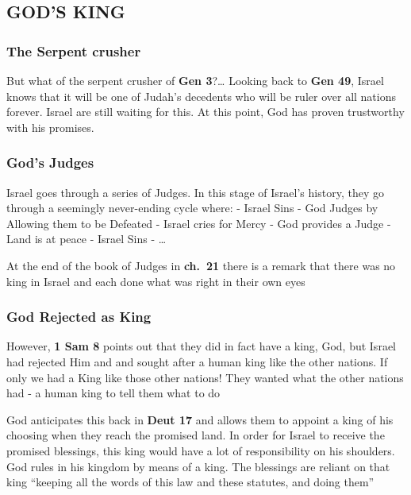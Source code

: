 \documentclass[]{article}
\begin{document}
\hypertarget{gods-king}{%
\subsection{GOD'S KING}\label{gods-king}}

\hypertarget{the-serpent-crusher}{%
\subsubsection{The Serpent crusher}\label{the-serpent-crusher}}

But what of the serpent crusher of \textbf{Gen 3}?\ldots{} Looking back
to \textbf{Gen 49}, Israel knows that it will be one of Judah's
decedents who will be ruler over all nations forever. Israel are still
waiting for this. At this point, God has proven trustworthy with his
promises.

\hypertarget{gods-judges}{%
\subsubsection{God's Judges}\label{gods-judges}}

Israel goes through a series of Judges. In this stage of Israel's
history, they go through a seemingly never-ending cycle where: - Israel
Sins - God Judges by Allowing them to be Defeated - Israel cries for
Mercy - God provides a Judge - Land is at peace - Israel Sins - \ldots{}

At the end of the book of Judges in \textbf{ch.~21} there is a remark
that there was no king in Israel and each done what was right in their
own eyes

\hypertarget{god-rejected-as-king}{%
\subsubsection{God Rejected as King}\label{god-rejected-as-king}}

However, \textbf{1 Sam 8} points out that they did in fact have a king,
God, but Israel had rejected Him and and sought after a human king like
the other nations. If only we had a King like those other nations! They
wanted what the other nations had - a human king to tell them what to do

God anticipates this back in \textbf{Deut 17} and allows them to appoint
a king of his choosing when they reach the promised land. In order for
Israel to receive the promised blessings, this king would have a lot of
responsibility on his shoulders. God rules in his kingdom by means of a
king. The blessings are reliant on that king ``keeping all the words of
this law and these statutes, and doing them''
\end{document}
